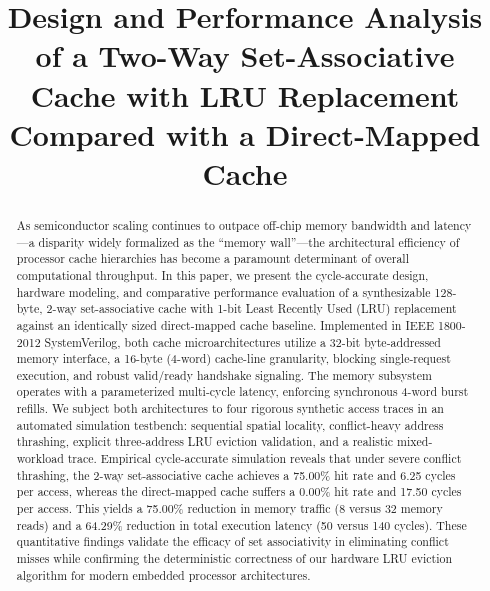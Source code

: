 \documentclass[conference]{IEEEtran}
\begin{document}
\title{Design and Performance Analysis of a Two-Way Set-Associative Cache with LRU Replacement Compared with a Direct-Mapped Cache}

\author{
}

\maketitle

\begin{abstract}
As semiconductor scaling continues to outpace off-chip memory bandwidth and latency---a disparity widely formalized as the ``memory wall''---the architectural efficiency of processor cache hierarchies has become a paramount determinant of overall computational throughput. In this paper, we present the cycle-accurate design, hardware modeling, and comparative performance evaluation of a synthesizable 128-byte, 2-way set-associative cache with 1-bit Least Recently Used (LRU) replacement against an identically sized direct-mapped cache baseline. Implemented in IEEE 1800-2012 SystemVerilog, both cache microarchitectures utilize a 32-bit byte-addressed memory interface, a 16-byte (4-word) cache-line granularity, blocking single-request execution, and robust valid/ready handshake signaling. The memory subsystem operates with a parameterized multi-cycle latency, enforcing synchronous 4-word burst refills. We subject both architectures to four rigorous synthetic access traces in an automated simulation testbench: sequential spatial locality, conflict-heavy address thrashing, explicit three-address LRU eviction validation, and a realistic mixed-workload trace. Empirical cycle-accurate simulation reveals that under severe conflict thrashing, the 2-way set-associative cache achieves a 75.00\% hit rate and 6.25 cycles per access, whereas the direct-mapped cache suffers a 0.00\% hit rate and 17.50 cycles per access. This yields a 75.00\% reduction in memory traffic (8 versus 32 memory reads) and a 64.29\% reduction in total execution latency (50 versus 140 cycles). These quantitative findings validate the efficacy of set associativity in eliminating conflict misses while confirming the deterministic correctness of our hardware LRU eviction algorithm for modern embedded processor architectures.
\end{abstract}
\end{document}

